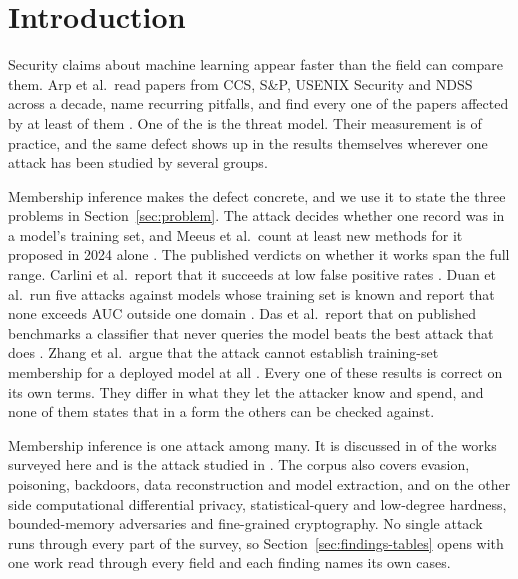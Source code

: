 \section{Introduction}
\label{sec:intro}

Security claims about machine learning appear faster than the field can compare
them. Arp et al.\ read \DDpapers{} papers from CCS, S\&P, USENIX Security and NDSS
across a decade, name \DDpitfalls{} recurring pitfalls, and find every one of the
\DDpapers{} papers affected by at least \DDminPitfalls{} of them \cite{AQPWPWCR22}.
One of the \DDpitfalls{} is the threat model. Their measurement is of practice, and
the same defect shows up in the results themselves wherever one attack has been
studied by several groups.

Membership inference makes the defect concrete, and we use it to state the three
problems in Section~\ref{sec:problem}. The attack decides whether one record was in
a model's training set, and Meeus et al.\ count at least \MIAnewMethods{} new
methods for it proposed in 2024 alone \cite{MSJFRM25}. The published verdicts on whether it works span the full range.
Carlini et al.\ report that it succeeds at low false positive rates
\cite{CCNSTT22}. Duan et al.\ run five attacks against models whose training set is
known and report that none exceeds \MIAmimirAUC{} AUC outside one domain
\cite{DSMMSZTCEH24}. Das et al.\ report that on \MIAblindSets{} published
benchmarks a classifier that never queries the model beats the best attack that
does \cite{DZT25}. Zhang et al.\ argue that the attack cannot establish training-set
membership for a deployed model at all \cite{ZDKT25}. Every one of these results is
correct on its own terms. They differ in what they let the attacker know and spend,
and none of them states that in a form the others can be checked against.

Membership inference is one attack among many. It is discussed in \NumMIApages{} of
the \NumSources{} works surveyed here and is the attack studied in \NumMIAfamily{}. The corpus also covers evasion, poisoning,
backdoors, data reconstruction and model extraction, and on the other side
computational differential privacy, statistical-query and low-degree hardness,
bounded-memory adversaries and fine-grained cryptography. No single attack runs
through every part of the survey, so Section~\ref{sec:findings-tables} opens with
one work read through every field and each finding names its own cases.

